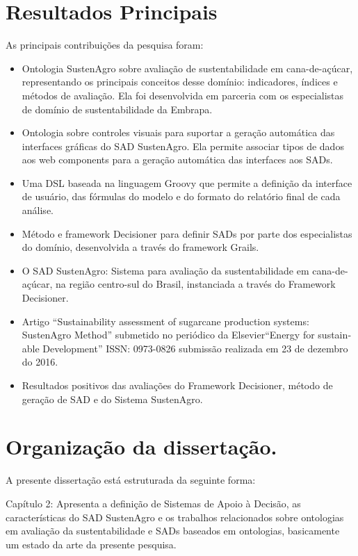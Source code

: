 \section{Resultados Principais}

As principais contribuições da pesquisa foram:
\begin{itemize}
\item Ontologia SustenAgro sobre avaliação de sustentabilidade em cana-de-açúcar,
representando os principais conceitos desse domínio: indicadores,
índices e métodos de avaliação. Ela foi desenvolvida em parceria com
os especialistas de domínio de sustentabilidade da Embrapa.
\item Ontologia sobre controles visuais para suportar a geração automática
das interfaces gráficas do SAD SustenAgro. Ela permite associar tipos
de dados aos \foreignlanguage{english}{web components} para a geração
automática das interfaces aos SADs.
\item Uma DSL baseada na linguagem \foreignlanguage{english}{Groovy} que
permite a definição da interface de usuário, das fórmulas do modelo
e do formato do relatório final de cada análise.
\item Método e framework Decisioner para definir SADs por parte dos especialistas
do domínio, desenvolvida a través do framework \foreignlanguage{english}{Grails}.
\item O SAD SustenAgro: Sistema para avaliação da sustentabilidade em cana-de-açúcar,
na região centro-sul do Brasil, instanciada a través do Framework
Decisioner.
\item Artigo ``\foreignlanguage{english}{Sustainability assessment of sugarcane
production systems: SustenAgro Method}'' submetido no periódico da
Elsevier``\foreignlanguage{english}{Energy for sustainable Development}''
ISSN: 0973-0826 submissão realizada em 23 de dezembro do 2016. 
\item Resultados positivos das avaliações do Framework Decisioner, método
de geração de SAD e do Sistema SustenAgro.
\end{itemize}

\section{Organização da dissertação.}

A presente dissertação está estruturada da seguinte forma:

Capítulo 2: Apresenta a definição de Sistemas de Apoio à Decisão,
as características do SAD SustenAgro e os trabalhos relacionados sobre
ontologias em avaliação da sustentabilidade e SADs baseados em ontologias,
basicamente um estado da arte da presente pesquisa.

